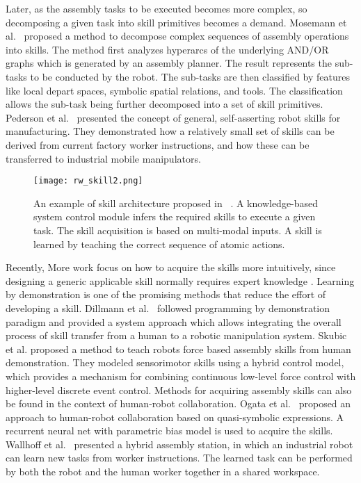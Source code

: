 Later, as the assembly tasks to be executed becomes more complex, so decomposing a given task into skill primitives becomes a demand.  Mosemann et al.~\cite{Mosemann2001} proposed a method to decompose complex sequences of assembly operations into skills. The method first analyzes hyperarcs of the underlying AND/OR graphs which is generated by an assembly planner. The result represents the sub-tasks to be conducted by the robot. The sub-tasks are then classified by features like local depart spaces, symbolic spatial relations, and tools. The classification allows the sub-task being further decomposed into a set of skill primitives. Pederson et al.~\cite{pedersen2016robot} presented the concept of general, self-asserting robot skills for manufacturing. They demonstrated how a relatively small set of skills can be derived from current factory worker instructions, and how these can be transferred to industrial mobile manipulators. 

\begin{figure}[!htbp]
\centering
\texttt{[image: rw\_skill2.png]}
\captionsetup{justification=raggedright}
\caption{An example of skill architecture proposed in ~\cite{Wallhoff2010}. A knowledge-based system control module infers the required skills to execute a given task. The skill acquisition is based on multi-modal inputs. A skill is learned by teaching the correct sequence of atomic actions. }
\label{fig:rw_skillarchitecture}       %
\end{figure} 
Recently, More work focus on how to acquire the skills more intuitively, since designing a generic applicable skill normally requires expert knowledge \cite{Hovland1996}. Learning by demonstration is one of the promising methods that reduce the effort of developing a skill. Dillmann et al.~\cite{Dillmann2000} followed programming by demonstration paradigm and provided a system approach which allows integrating the overall process of skill transfer from a human to a robotic manipulation system.   Skubic et al. proposed a method to teach robots force based assembly skills from human demonstration. They modeled sensorimotor skills using a hybrid control model, which provides a mechanism for combining continuous low-level force control with higher-level discrete event control. Methods for acquiring assembly skills can also be found in the context of human-robot collaboration. Ogata et al.~\cite{Ogata2005} proposed an approach to human-robot collaboration based on quasi-symbolic expressions. A recurrent neural net with parametric bias  model is used to acquire the skills. Wallhoff et al.~\cite{Wallhoff2010} presented a hybrid assembly station, in which an industrial robot can learn new tasks from worker instructions. The learned task can be performed by both the robot and the human worker together in a shared workspace. 

